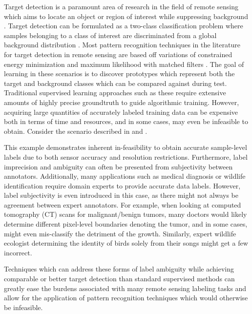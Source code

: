 Target detection is a paramount area of research in the field of remote sensing which aims to locate an object or region of interest while suppressing background \cite{Geng2017TargetDetection,Chaudhuri1995TargetDetection}.  Target detection can be formulated as a two-class classification problem where samples belonging to a class of interest are discriminated from a global background distribution \cite{Zare2016MIACE}.  Most pattern recognition techniques in the literature for target detection in remote sensing are based off variations of constrained energy minimization and maximum likelihood with matched filters \cite{Geng2017TargetDetection,Chaudhuri1995TargetDetection}. The goal of learning in these scenarios is to discover prototypes which represent both the target and background classes which can be compared against during test.  Traditional supervised learning approaches such as these require extensive amounts of highly precise groundtruth to guide algorithmic training.  However, acquiring large quantities  of accurately labeled training data can be expensive both in terms of time and resources, and in some cases, may even be infeasible to obtain.  Consider the scenario described in \cite{Du2017Thesis} and \cite{Bocinsky2019Thesis}.  

This example demonstrates inherent in-feasibility to obtain accurate sample-level labels due to both sensor accuracy and resolution restrictions.  Furthermore, label imprecision and ambiguity can often be presented from subjectivity between annotators. Additionally, many applications such as medical diagnosis or wildlife identification require domain experts to provide accurate data labels.  However, label subjectivity is even introduced in this  case, as there might not always be agreement between expert annotators.  For example, when looking at computed tomography (CT) scans for malignant/benign tumors, many doctors would likely determine different pixel-level boundaries denoting the tumor, and in some cases, might even mis-classify the detriment of the growth.  Similarly, expert wildlife  ecologist determining the identity of birds solely from their songs might get a few incorrect.

Techniques which can address these forms of label ambiguity while achieving comparable or better target detection than standard supervised methods can greatly ease the burdens associated with many remote sensing labeling tasks and allow for the application of pattern recognition techniques which would otherwise be infeasible.



